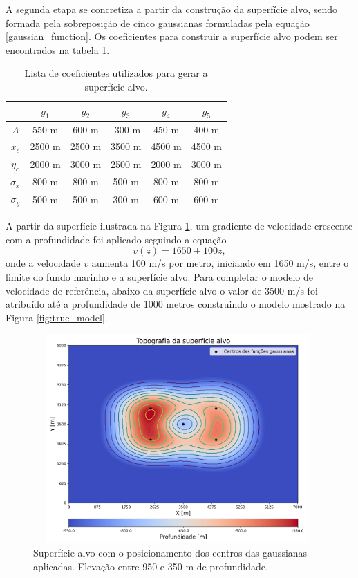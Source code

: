 A segunda etapa se concretiza a partir da construção da superfície alvo, sendo formada pela sobreposição de cinco gaussianas formuladas pela equação \ref{gaussian_function}. Os coeficientes para construir a superfície alvo podem ser encontrados na tabela \ref{target_gaussian_coefs}.
\begin{table}[H]
	\caption{Lista de coeficientes utilizados para gerar a superfície alvo.}
	\begin{tabular}{c|ccccc}
		& $g_1$  & $g_2$  & $g_3$  & $g_4$  & $g_5$  \\ \hline
		$A$        & 550 m  & 600 m  & -300 m & 450 m  & 400 m  \\ \hline
		$x_c$      & 2500 m & 2500 m & 3500 m & 4500 m & 4500 m \\ \hline
		$y_c$      & 2000 m & 3000 m & 2500 m & 2000 m & 3000 m \\ \hline
		$\sigma_x$ & 800 m  & 800 m  & 500 m  & 800 m  & 800 m  \\ \hline
		$\sigma_y$ & 500 m  & 500 m  & 300 m  & 600 m  & 600 m 
	\end{tabular}
	\label{target_gaussian_coefs}
\end{table}
\noindent A partir da superfície ilustrada na Figura \ref{fig:target_surface_gaussian}, um gradiente de velocidade crescente com a profundidade foi aplicado seguindo a equação 
\begin{equation}
	v(z) = 1650 + 100 z,
\end{equation}
\noindent onde a velocidade $v$ aumenta 100 m/s por metro, iniciando em 1650 m/s, entre o limite do fundo marinho e a superfície alvo. Para completar o modelo de velocidade de referência, abaixo da superfície alvo o valor de 3500 m/s foi atribuído até a profundidade de 1000 metros construindo o modelo mostrado na Figura \ref{fig:true_model}.
\begin{figure}[H]
	\centering
	\includegraphics[width=11cm,height=8cm]{Imgs/Metodologia/target_surface_gaussian.png}
	\caption{Superfície alvo com o posicionamento dos centros das gaussianas aplicadas. Elevação entre 950 e 350 m de profundidade.}
	\label{fig:target_surface_gaussian}	
\end{figure}
